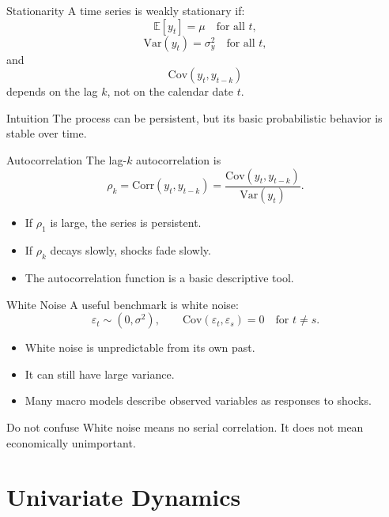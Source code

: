 \documentclass[11pt,aspectratio=169]{beamer}
\newcommand{\E}{\mathbb{E}}
\newcommand{\Var}{\mathrm{Var}}
\newcommand{\Cov}{\mathrm{Cov}}
\newcommand{\Corr}{\mathrm{Corr}}
\newcommand{\derivbutton}[1]{\vspace{0.4em}\hfill\hyperlink{app:#1}{\beamerbutton{Appendix details}}}
\begin{document}
\begin{frame}{Stationarity}
  \hypertarget{main:stationarity}{}
  A time series is weakly stationary if:
  \[
    \E[y_t]=\mu \quad \text{for all }t,
  \]
  \[
    \Var(y_t)=\sigma_y^2 \quad \text{for all }t,
  \]
  and
  \[
    \Cov(y_t,y_{t-k})
  \]
  depends on the lag \(k\), not on the calendar date \(t\).

  \begin{block}{Intuition}
    The process can be persistent, but its basic probabilistic behavior is stable over time.
  \end{block}
  \derivbutton{ar-stationarity}
\end{frame}

\begin{frame}{Autocorrelation}
  The lag-\(k\) autocorrelation is
  \[
    \rho_k
    =
    \Corr(y_t,y_{t-k})
    =
    \frac{\Cov(y_t,y_{t-k})}{\Var(y_t)}.
  \]

  \begin{itemize}
    \item If \(\rho_1\) is large, the series is persistent.
    \item If \(\rho_k\) decays slowly, shocks fade slowly.
    \item The autocorrelation function is a basic descriptive tool.
  \end{itemize}
\end{frame}

\begin{frame}{White Noise}
  A useful benchmark is white noise:
  \[
    \varepsilon_t \sim (0,\sigma^2),\qquad
    \Cov(\varepsilon_t,\varepsilon_s)=0 \quad \text{for }t\neq s.
  \]

  \begin{itemize}
    \item White noise is unpredictable from its own past.
    \item It can still have large variance.
    \item Many macro models describe observed variables as responses to shocks.
  \end{itemize}

  \begin{block}{Do not confuse}
    White noise means no serial correlation. It does not mean economically unimportant.
  \end{block}
\end{frame}

\section{Univariate Dynamics}
\end{document}
